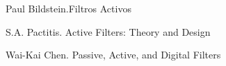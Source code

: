 \documentclass[informe.tex]{subfiles}
\begin{document}
Paul Bildstein.Filtros Activos\newline

S.A. Pactitis. Active Filters: Theory and Design\newline

Wai-Kai Chen. Passive, Active, and Digital Filters\newline
\end{document}
